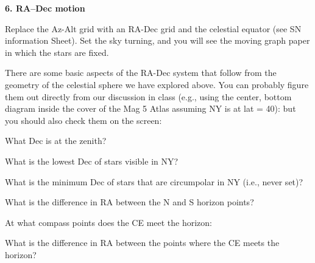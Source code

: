 \bigskip\noindent
{\bf 6. RA--Dec motion}

\medskip\noindent
Replace the Az-Alt grid with an RA-Dec grid and the celestial equator
(see SN information Sheet). Set the sky turning, and you will see the
moving graph paper in which the stars are fixed.

\noindent
There are some basic aspects of the RA-Dec system that follow from the
geometry of the celestial sphere we have explored above. You can
probably figure them out directly from our discussion in class (e.g.,
using the center, bottom diagram inside the cover of the Mag 5 Atlas
assuming NY is at lat = 40\deg): but
you should also check them on the screen: 

\bigskip
\noindent
What Dec is at the zenith?\  \makebox[4cm]{\hrulefill}

\noindent
What is the lowest Dec of stars visible in NY?  \makebox[4cm]{\hrulefill}

\noindent
What is the minimum Dec of stars that are circumpolar in NY (i.e.,
never set)? \makebox[3cm]{\hrulefill}

\noindent
What is the difference in RA between the N and S horizon
points? \makebox[4cm]{\hrulefill}

\noindent
At what compass points does the CE meet the horizon:\makebox[3cm]{\hrulefill}

\noindent
What is the difference in RA between the points where the CE meets the
horizon? \makebox[3cm]{\hrulefill}
